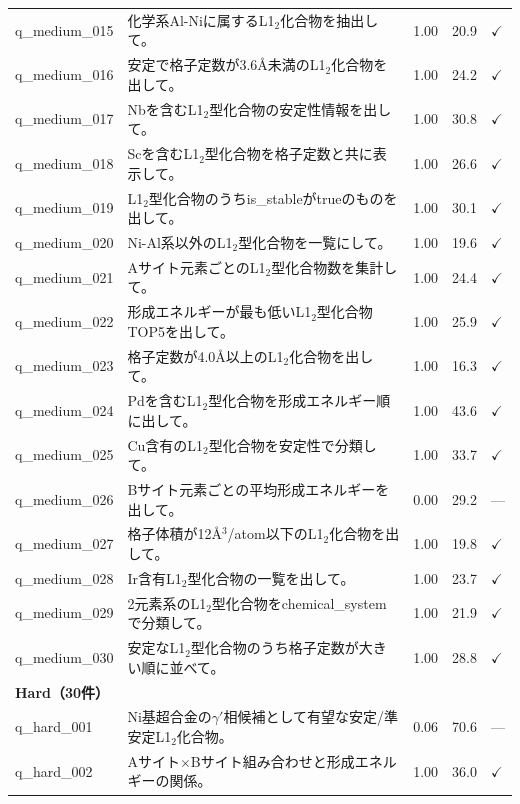 \documentclass[5p,twocolumn]{elsarticle}
\begin{document}
\begin{longtable}{lp{8.5cm}ccl}
    q\_medium\_015 & 化学系Al-Niに属するL1$_2$化合物を抽出して。 & 1.00 & 20.9 & $\checkmark$ \\
    q\_medium\_016 & 安定で格子定数が3.6\AA 未満のL1$_2$化合物を出して。 & 1.00 & 24.2 & $\checkmark$ \\
    q\_medium\_017 & Nbを含むL1$_2$型化合物の安定性情報を出して。 & 1.00 & 30.8 & $\checkmark$ \\
    q\_medium\_018 & Scを含むL1$_2$型化合物を格子定数と共に表示して。 & 1.00 & 26.6 & $\checkmark$ \\
    q\_medium\_019 & L1$_2$型化合物のうちis\_stableがtrueのものを出して。 & 1.00 & 30.1 & $\checkmark$ \\
    q\_medium\_020 & Ni-Al系以外のL1$_2$型化合物を一覧にして。 & 1.00 & 19.6 & $\checkmark$ \\
    q\_medium\_021 & Aサイト元素ごとのL1$_2$型化合物数を集計して。 & 1.00 & 24.4 & $\checkmark$ \\
    q\_medium\_022 & 形成エネルギーが最も低いL1$_2$型化合物TOP5を出して。 & 1.00 & 25.9 & $\checkmark$ \\
    q\_medium\_023 & 格子定数が4.0\AA 以上のL1$_2$化合物を出して。 & 1.00 & 16.3 & $\checkmark$ \\
    q\_medium\_024 & Pdを含むL1$_2$型化合物を形成エネルギー順に出して。 & 1.00 & 43.6 & $\checkmark$ \\
    q\_medium\_025 & Cu含有のL1$_2$型化合物を安定性で分類して。 & 1.00 & 33.7 & $\checkmark$ \\
    q\_medium\_026 & Bサイト元素ごとの平均形成エネルギーを出して。 & 0.00 & 29.2 & --- \\
    q\_medium\_027 & 格子体積が12\AA$^3$/atom以下のL1$_2$化合物を出して。 & 1.00 & 19.8 & $\checkmark$ \\
    q\_medium\_028 & Ir含有L1$_2$型化合物の一覧を出して。 & 1.00 & 23.7 & $\checkmark$ \\
    q\_medium\_029 & 2元素系のL1$_2$型化合物をchemical\_systemで分類して。 & 1.00 & 21.9 & $\checkmark$ \\
    q\_medium\_030 & 安定なL1$_2$型化合物のうち格子定数が大きい順に並べて。 & 1.00 & 28.8 & $\checkmark$ \\
    \midrule
    \multicolumn{5}{l}{\textbf{Hard（30件）}} \\
    \midrule
    q\_hard\_001 & Ni基超合金の$\gamma'$相候補として有望な安定/準安定L1$_2$化合物。 & 0.06 & 70.6 & --- \\
    q\_hard\_002 & Aサイト$\times$Bサイト組み合わせと形成エネルギーの関係。 & 1.00 & 36.0 & $\checkmark$ \\

\end{longtable}
\end{document}
